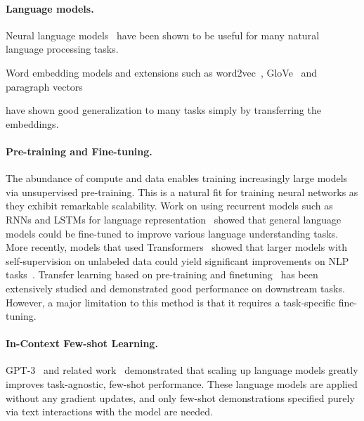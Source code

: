 \paragraph{Language models.} Neural language models~\cite{Mikolov2010rnnlm,sutskever2011_rnnlm} have been shown to be useful for many natural language processing tasks.

Word embedding models and extensions such as word2vec~\cite{mikolov2013efficient}, GloVe~\cite{pennington-glove} and paragraph vectors~\cite{le2014distributed}

have shown good generalization to many tasks simply by transferring the embeddings. 

\paragraph{Pre-training and Fine-tuning.} The abundance of compute and data enables training increasingly large models via unsupervised pre-training. This is a natural fit for training neural networks as they exhibit remarkable scalability. Work on using recurrent models such as RNNs and LSTMs for language representation~\cite{NIPS2015_dai,kiros-skip-thought} showed that general language models could be fine-tuned to improve various language understanding tasks. More recently, models that used Transformers~\cite{vaswani2017attention} showed that larger models with self-supervision on unlabeled data could yield significant improvements on NLP tasks~\cite{devlin2018bert,yang2019xlnet,liu2019roberta,clark2020electra}. Transfer learning based on pre-training and finetuning~\cite{raffel2020exploring,houlsby2019parameterefficient} has been extensively studied and  demonstrated good performance on downstream tasks. However, a major limitation to this method is that it requires a task-specific fine-tuning. 

\paragraph{In-Context Few-shot Learning.} GPT-3~\cite{NEURIPS2020_gpt3} and related work~\cite{shoeybi2019megatron,lieber2021jurassic,wei2021finetuned} demonstrated that scaling up language models greatly improves task-agnostic, few-shot performance. These language models  are applied without any gradient updates, and only few-shot demonstrations specified purely via text interactions with the model are needed. 

